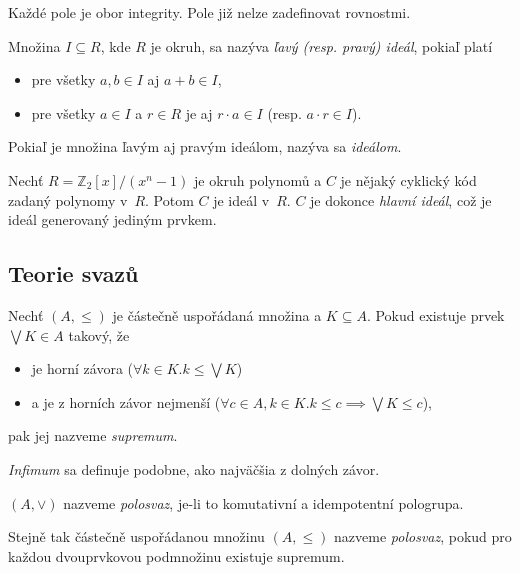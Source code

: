 Každé pole je obor integrity. Pole již nelze zadefinovat rovnostmi.

\begin{definition}[Ideál]
	Množina $I \subseteq R$, kde $R$ je okruh, sa nazýva 
	{\em ľavý (resp. pravý) ideál}, pokiaľ platí
	\begin{itemize}
		\item pre všetky $a,b \in I$ aj $a+b \in I$,
		\item pre všetky $a \in I$ a $r \in R$ je aj $r \cdot a \in I$ (resp. $a \cdot r \in I$).
	\end{itemize}
	Pokiaľ je množina ľavým aj pravým ideálom, nazýva sa {\em ideálom}.
\end{definition}


\begin{example}
    Nechť $R = \mathbb{Z}_2[x] / (x^n - 1)$ je okruh polynomů
    a $C$ je nějaký cyklický kód zadaný polynomy v~$R$.
    Potom $C$ je ideál v~$R$.
    $C$ je dokonce {\em hlavní ideál}, což je ideál generovaný jediným prvkem.
\end{example}

\subsection{Teorie svazů}

\begin{definition}[Supremum]
    Nechť $(A, \leq)$ je částečně uspořádaná množina
    a $K \subseteq A$. Pokud existuje prvek $\bigvee K \in A$ takový,
    že
    \begin{itemize}
        \item je horní závora ($\forall k \in K . k \leq \bigvee K$)
        \item a je z horních závor nejmenší
    ($\forall c \in A, k \in K . k \leq c \implies \bigvee K \leq c$),
    \end{itemize}
    pak jej nazveme {\em supremum}.
\end{definition}

{\em Infimum} sa definuje podobne, ako najväčšia z dolných závor.

\begin{definition}[Polosvaz]
    $(A, \vee)$ nazveme {\em polosvaz}, je-li to komutativní a
    idempotentní pologrupa.

    Stejně tak částečně uspořádanou množinu $(A, \leq)$ nazveme
    {\em polosvaz}, pokud pro každou dvouprvkovou podmnožinu existuje supremum.
\end{definition}


